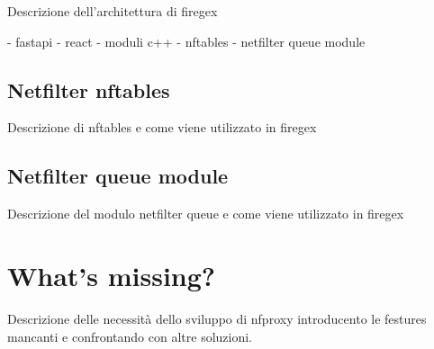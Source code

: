 Descrizione dell'architettura di firegex

- fastapi
- react
- moduli c++
- nftables
- netfilter queue module

\subsection{Netfilter nftables}

Descrizione di nftables e come viene utilizzato in firegex

\subsection{Netfilter queue module}

Descrizione del modulo netfilter queue e come viene utilizzato in firegex

\section{What's missing?}

Descrizione delle necessità dello sviluppo di nfproxy introducento le festures mancanti
e confrontando con altre soluzioni.
